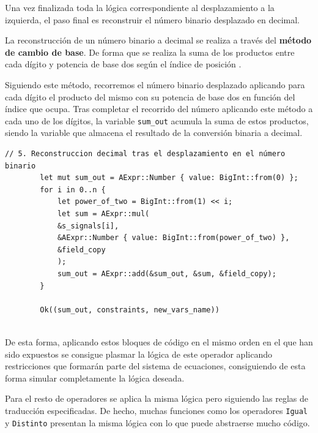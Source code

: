 \documentclass[a4paper,12pt]{report}
\begin{document}
	\vspace{0.2cm}
	\noindent Una vez finalizada toda la lógica correspondiente al desplazamiento a la izquierda, el paso final es reconstruir el número binario desplazado en decimal.
	
	\vspace{0.2cm}
	\noindent La reconstrucción de un número binario a decimal se realiza a través del \textbf{método de cambio de base}. De forma que se realiza la suma de los productos entre cada dígito y potencia de base dos según el índice de posición \cite{geeknetic_binario}.
	
	\vspace{0.2cm}
	\noindent Siguiendo este método, recorremos el número binario desplazado aplicando para cada dígito el producto del mismo con su potencia de base dos en función del índice que ocupa. Tras completar el recorrido del número aplicando este método a cada uno de los dígitos, la variable \texttt{sum\_out} acumula la suma de estos productos, siendo la variable que almacena el resultado de la conversión binaria a decimal.
	
	\vspace{0.3cm}
	\begin{lstlisting}[style=RustStyle, caption={},         basicstyle=\ttfamily\scriptsize, 
		xleftmargin=0pt
		]        // 5. Reconstruccion decimal tras el desplazamiento en el número binario
		let mut sum_out = AExpr::Number { value: BigInt::from(0) };
		for i in 0..n {
			let power_of_two = BigInt::from(1) << i;
			let sum = AExpr::mul(
			&s_signals[i],
			&AExpr::Number { value: BigInt::from(power_of_two) },
			&field_copy
			);
			sum_out = AExpr::add(&sum_out, &sum, &field_copy);
		}
		
		Ok((sum_out, constraints, new_vars_name))
		
	\end{lstlisting}
	
	
	\vspace{0.2cm}
	\noindent De esta forma, aplicando estos bloques de código en el mismo orden en el que han sido expuestos se consigue plasmar la lógica de este operador aplicando restricciones que formarán parte del sistema de ecuaciones, consiguiendo de esta forma simular completamente la lógica deseada.
	
	\vspace{0.2cm}
	\noindent Para el resto de operadores se aplica la misma lógica pero siguiendo las reglas de traducción especificadas. De hecho, muchas funciones como los operadores \texttt{Igual} y \texttt{Distinto} presentan la misma lógica con lo que puede abstraerse mucho código.
	
\end{document}
